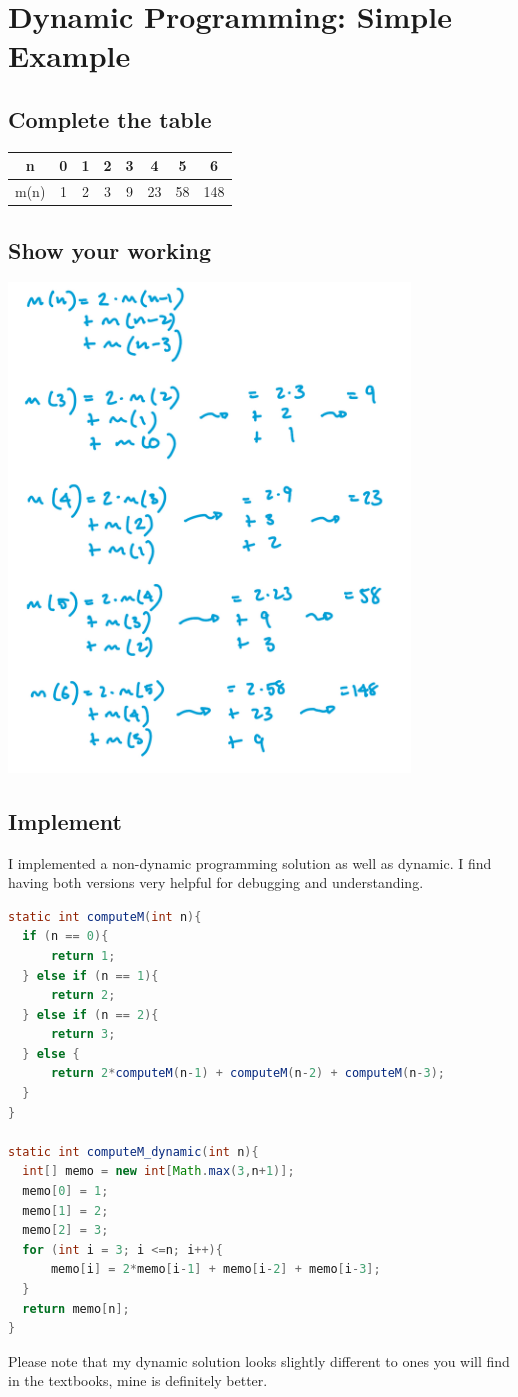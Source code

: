 \documentclass[twoside=false,DIV=14]{scrartcl}
\begin{document}
\section{Dynamic Programming: Simple Example}
\subsection{Complete the table}
\begin{tabular}{|c||c|c|c|c|c|c|c|}
\hline
n&0&1&2&3&4&5&6\\
\hline
m(n)&1&2&3&9&23&58&148\\
\hline
\end{tabular}
      
\subsection{Show your working}
\includegraphics[width=0.8\textwidth]{table_working.jpeg}

\subsection{Implement}
I implemented a non-dynamic programming solution as well as dynamic.  I find having both versions very helpful for debugging and understanding.
\begin{lstlisting}[language=java]
static int computeM(int n){
  if (n == 0){
      return 1;
  } else if (n == 1){
      return 2;
  } else if (n == 2){
      return 3;
  } else {
      return 2*computeM(n-1) + computeM(n-2) + computeM(n-3);
  }
}

static int computeM_dynamic(int n){
  int[] memo = new int[Math.max(3,n+1)];
  memo[0] = 1;
  memo[1] = 2;
  memo[2] = 3;
  for (int i = 3; i <=n; i++){
      memo[i] = 2*memo[i-1] + memo[i-2] + memo[i-3];
  }
  return memo[n];
}
\end{lstlisting}
Please note that my dynamic solution looks slightly different to ones you will find in the textbooks, mine is definitely better.
\end{document}
